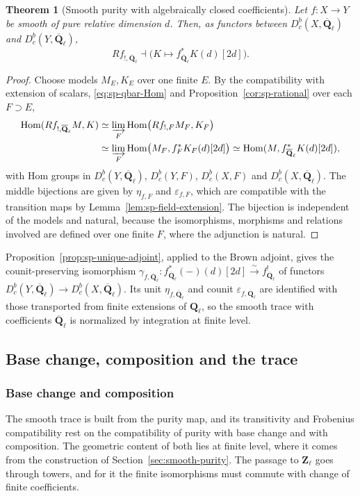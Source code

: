 \documentclass[11pt,a4paper]{article}
\numberwithin{equation}{section}
\newtheorem{theorem}{Theorem}[section]
\theoremstyle{definition}
\theoremstyle{remark}
\newcommand{\Dbc}{D^b_c}
\newcommand{\Qbar}{\overline{\mathbf Q}_\ell}
\newcommand{\Ql}{\mathbf Q_\ell}
\newcommand{\Zl}{\mathbf Z_\ell}
\begin{document}
\begin{theorem}[Smooth purity with algebraically closed coefficients]
\label{thm:sp-qbar}
Let $f:X\to Y$ be smooth of pure relative dimension $d$. Then, as
functors between $\Dbc(X,\Qbar)$ and $\Dbc(Y,\Qbar)$,
\[
 Rf_{!,\Qbar}\dashv
       \bigl(K\longmapsto f_{\Qbar}^*K(d)[2d]\bigr).
\]
\end{theorem}
\begin{proof}
Choose models $M_E,K_E$ over one finite $E$. By the compatibility with
extension of scalars, \eqref{eq:sp-qbar-Hom} and
Proposition~\ref{cor:sp-rational} over each $F\supset E$,
\[
 \begin{aligned}
 \operatorname{Hom}(Rf_{!,\Qbar}M,K)
 &\simeq\varinjlim_{F}\operatorname{Hom}\bigl(Rf_{!,F}M_F,K_F\bigr)\\
 &\simeq\varinjlim_{F}\operatorname{Hom}\bigl(M_F,f_F^*K_F(d)[2d]\bigr)
 \simeq\operatorname{Hom}(M,f_{\Qbar}^*K(d)[2d]),
 \end{aligned}
\]
with Hom groups in $\Dbc(Y,\Qbar)$, $\Dbc(Y,F)$, $\Dbc(X,F)$ and
$\Dbc(X,\Qbar)$.
The middle bijections are given by $\eta_{f,F}$ and $\varepsilon_{f,F}$,
which are compatible with the transition maps by
Lemma~\ref{lem:sp-field-extension}. The bijection is independent of
the models and natural, because the isomorphisms, morphisms and
relations involved are defined over one finite $F$, where the
adjunction is natural.
\end{proof}

Proposition~\ref{prop:sp-unique-adjoint}, applied to the Brown adjoint,
gives the counit-preserving isomorphism $\gamma_{f,\Qbar}:f_{\Qbar}^*(-)(d)[2d]\xrightarrow{\sim}
f_{\Qbar}^!$ of functors $\Dbc(Y,\Qbar)\to\Dbc(X,\Qbar)$. Its unit $\eta_{f,\Qbar}$ and counit
$\varepsilon_{f,\Qbar}$ are identified with those transported from
finite extensions of $\Ql$, so the smooth trace with coefficients
$\Qbar$ is normalized by integration at finite level.

\subsection{Base change, composition and the trace}
\label{sp:grp-trace}

\subsubsection{Base change and composition}

The smooth trace is built from the purity map, and its transitivity and
Frobenius compatibility rest on the compatibility of purity with base
change and with composition. The geometric content of both lies at
finite level, where it comes from the construction of
Section~\ref{sec:smooth-purity}. The passage to $\Zl$ goes through
towers, and for it the finite isomorphisms must commute with change of
finite coefficients.
\end{document}
